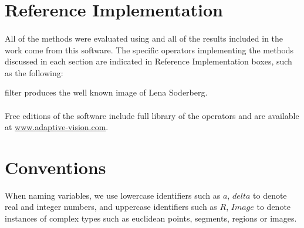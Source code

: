 \section*{Reference Implementation}

\paragraph*{}
All of the methods were evaluated using \studio and all of the results included in the work come from this software. The specific operators implementing the methods discussed in each section are indicated in Reference Implementation boxes, such as the following:

\begin{refImpl} 
\studio filter  produces the well known image of Lena Soderberg.
\end{refImpl}

\paragraph*{}
Free editions of the software include full library of the operators and are available at \href{http://www.adaptive-vision.com}{www.adaptive-vision.com}.

\section*{Conventions}

When naming variables, we use lowercase identifiers such as $a$, $delta$ to denote real and integer numbers, and uppercase identifiers such as $R$, $Image$ to denote instances of complex types such as euclidean points, segments, regions or images.